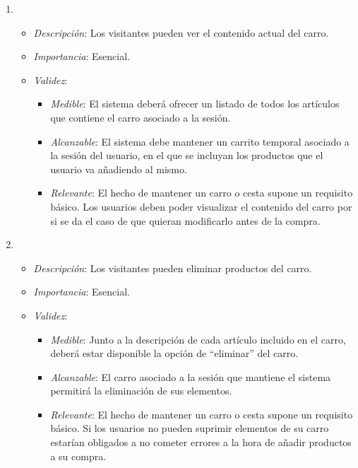 \begin{enumerate}[{\bf RF-1}]
\item 
  \begin{itemize}
  \item \textit{Descripción}: Los visitantes pueden ver el contenido actual del carro.
  \item \textit{Importancia}: Esencial.
  \item \textit{Validez}:
    \begin{itemize}
    \item \textit{Medible}: El sistema deberá ofrecer un listado de todos los artículos que contiene el carro asociado a la sesión.
    \item \textit{Alcanzable}: El sistema debe mantener un carrito temporal asociado a la sesión del usuario, en el que se incluyan los productos que el usuario va añadiendo al mismo.
    \item \textit{Relevante}: El hecho de mantener un carro o cesta supone un requisito básico. Los usuarios deben poder visualizar el contenido del carro por si se da el caso de que quieran modificarlo antes de la compra.
    \end{itemize}
  \end{itemize}

\item 
  \begin{itemize}
  \item \textit{Descripción}: Los visitantes pueden eliminar productos del carro.
  \item \textit{Importancia}: Esencial.
  \item \textit{Validez}:
    \begin{itemize}
    \item \textit{Medible}: Junto a la descripción de cada artículo incluido en el carro, deberá estar disponible la opción de ``eliminar'' del carro.
    \item \textit{Alcanzable}: El carro asociado a la sesión que mantiene el sistema permitirá la eliminación de sus elementos.
    \item \textit{Relevante}: El hecho de mantener un carro o cesta supone un requisito básico. Si los usuarios no pueden suprimir elementos de su carro estarían obligados a no cometer errores a la hora de añadir productos a su compra.
    \end{itemize}
  \end{itemize}




\end{enumerate}
